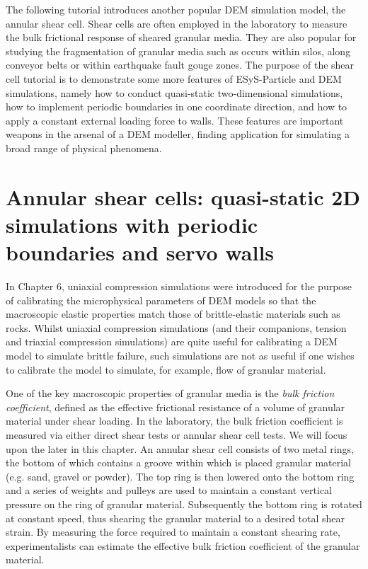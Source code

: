 The following tutorial introduces another popular DEM simulation model, the annular shear cell. Shear cells are often employed in the laboratory to measure the bulk frictional response of sheared granular media. They are also popular for studying the fragmentation of granular media such as occurs within silos, along conveyor belts or within earthquake fault gouge zones. The purpose of the shear cell tutorial is to demonstrate some more features of ESyS-Particle and DEM simulations, namely how to conduct quasi-static two-dimensional simulations, how to implement periodic boundaries in one coordinate direction, and how to apply a constant external loading force to walls. These features are important weapons in the arsenal of a DEM modeller, finding application for simulating a broad range of physical phenomena.

\newpage
\section{Annular shear cells: quasi-static 2D simulations with periodic boundaries and servo walls}

In Chapter 6, uniaxial compression simulations were introduced for the purpose of calibrating the microphysical parameters of DEM models so that the macroscopic elastic properties match those of brittle-elastic materials such as rocks. Whilst uniaxial compression simulations (and their companions, tension and triaxial compression simulations) are quite useful for calibrating a DEM model to simulate brittle failure, such simulations are not as useful if one wishes to calibrate the model to simulate, for example, flow of granular material. 

One of the key macroscopic properties of granular media is the \emph{bulk friction coefficient}, defined as the effective frictional resistance of a volume of granular material under shear loading.  In the laboratory, the bulk friction coefficient is measured via either direct shear tests or annular shear cell tests. We will focus upon the later in this chapter. An annular shear cell consists of two metal rings, the bottom of which contains a groove within which is placed granular material (e.g. sand, gravel or powder). The top ring is then lowered onto the bottom ring and a series of weights and pulleys are used to maintain a constant vertical pressure on the ring of granular material. Subsequently the bottom ring is rotated at constant speed, thus shearing the granular material to a desired total shear strain. By measuring the force required to maintain a constant shearing rate, experimentalists can estimate the effective bulk friction coefficient of the granular material. 

